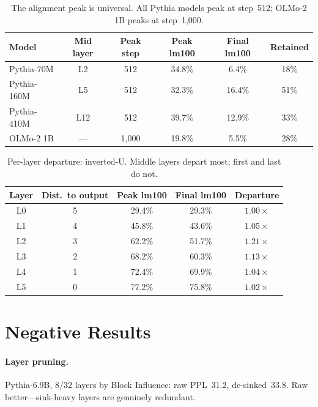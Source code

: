 \documentclass[11pt]{article}
\begin{document}
\begin{table}[h]
\centering
\caption{The alignment peak is universal. All Pythia models peak at step~512; OLMo-2 1B peaks at step~1{,}000.}
\small
\begin{tabular}{@{}lccccc@{}}
\toprule
\textbf{Model} & \textbf{Mid layer} & \textbf{Peak step} & \textbf{Peak lm100} & \textbf{Final lm100} & \textbf{Retained} \\
\midrule
Pythia-70M & L2 & 512 & 34.8\% & 6.4\% & 18\% \\
Pythia-160M & L5 & 512 & 32.3\% & 16.4\% & 51\% \\
Pythia-410M & L12 & 512 & 39.7\% & 12.9\% & 33\% \\
OLMo-2 1B & --- & 1{,}000 & 19.8\% & 5.5\% & 28\% \\
\bottomrule
\end{tabular}
\end{table}

\begin{table}[h]
\centering
\caption{Per-layer departure: inverted-U. Middle layers depart most; first and last do not.}
\small
\begin{tabular}{@{}ccccc@{}}
\toprule
\textbf{Layer} & \textbf{Dist.\ to output} & \textbf{Peak lm100} & \textbf{Final lm100} & \textbf{Departure} \\
\midrule
L0 & 5 & 29.4\% & 29.3\% & $1.00\times$ \\
L1 & 4 & 45.8\% & 43.6\% & $1.05\times$ \\
L2 & 3 & 62.2\% & 51.7\% & $\mathbf{1.21\times}$ \\
L3 & 2 & 68.2\% & 60.3\% & $1.13\times$ \\
L4 & 1 & 72.4\% & 69.9\% & $1.04\times$ \\
L5 & 0 & 77.2\% & 75.8\% & $1.02\times$ \\
\bottomrule
\end{tabular}
\end{table}

\section{Negative Results}\label{app:negative}

\paragraph{Layer pruning.} Pythia-6.9B, 8/32 layers by Block Influence: raw PPL~31.2, de-sinked~33.8. Raw better---sink-heavy layers are genuinely redundant.
\end{document}
